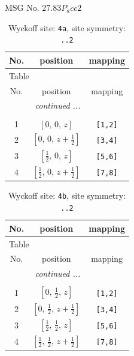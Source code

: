 \documentclass[fleqn,8pt]{jsarticle}
\begin{document}
\setcounter{MaxMatrixCols}{32}

\renewcommand{\tablename}{Table~}
\renewcommand{\figurename}{Figure~}
\begin{center}
\LARGE
MSG No. 27.83\quad$P_{a}cc2$
\end{center}
\renewcommand{\arraystretch}{1.2}
\begin{longtable}{ccc}
\caption{Wyckoff site: {\tt 4a}, site symmetry: {\tt ..2}}
 \\
 \hline \hline
No. & position & mapping \\ \hline \endfirsthead

\multicolumn{2}{l}{\tablename\ \thetable{}} \\
 \hline \hline
No. & position & mapping \\ \hline \endhead

 \hline \hline
\multicolumn{2}{r}{\footnotesize\it continued ...} \\ \endfoot

 \hline \hline
\multicolumn{2}{r}{} \\ \endlastfoot

1 & $\left[ 0,\, 0,\, z \right]$ & {\tt [1,2]} \\ \hline
2 & $\left[ 0,\, 0,\, z + \frac{1}{2} \right]$ & {\tt [3,4]} \\ \hline
3 & $\left[ \frac{1}{2},\, 0,\, z \right]$ & {\tt [5,6]} \\ \hline
4 & $\left[ \frac{1}{2},\, 0,\, z + \frac{1}{2} \right]$ & {\tt [7,8]} \\
\end{longtable}
\renewcommand{\arraystretch}{1.2}
\begin{longtable}{ccc}
\caption{Wyckoff site: {\tt 4b}, site symmetry: {\tt ..2}}
 \\
 \hline \hline
No. & position & mapping \\ \hline \endfirsthead

\multicolumn{2}{l}{\tablename\ \thetable{}} \\
 \hline \hline
No. & position & mapping \\ \hline \endhead

 \hline \hline
\multicolumn{2}{r}{\footnotesize\it continued ...} \\ \endfoot

 \hline \hline
\multicolumn{2}{r}{} \\ \endlastfoot

1 & $\left[ 0,\, \frac{1}{2},\, z \right]$ & {\tt [1,2]} \\ \hline
2 & $\left[ 0,\, \frac{1}{2},\, z + \frac{1}{2} \right]$ & {\tt [3,4]} \\ \hline
3 & $\left[ \frac{1}{2},\, \frac{1}{2},\, z \right]$ & {\tt [5,6]} \\ \hline
4 & $\left[ \frac{1}{2},\, \frac{1}{2},\, z + \frac{1}{2} \right]$ & {\tt [7,8]} \\
\end{longtable}
\end{document}
